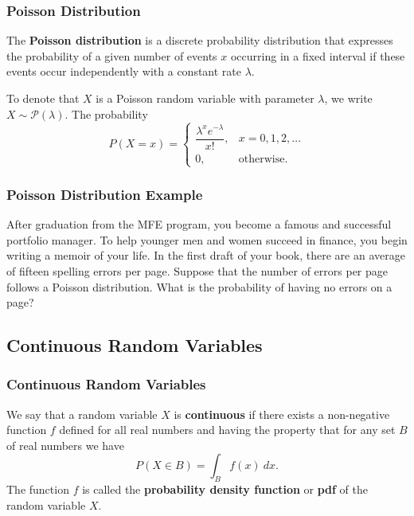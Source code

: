 \documentclass{beamer}
\begin{document}
\begin{frame}
\frametitle{Poisson Distribution}
\begin{Definition} 
The {\bf Poisson distribution} is a discrete probability distribution that expresses the probability of a given number of events $x$ occurring in a fixed interval if these events occur independently with a constant rate $\lambda$.
\end{Definition}
To denote that $X$ is a Poisson random variable with parameter $\lambda$, we write $X\sim{\mathcal{P}(\lambda)}$. The probability 
$$
P(X = x) = \begin{cases} \dfrac{\lambda^x e^{-\lambda}}{x!},&  x = 0, 1, 2,\ldots\\ 0,	&	\text{otherwise.}\end{cases}
$$
\end{frame}

\begin{frame}[t]
\frametitle{Poisson Distribution Example}
\tiny
\begin{Example}
After graduation from the MFE program, you become a famous and successful portfolio manager. To help younger men and women succeed in finance, you begin writing a memoir of your life. In the first draft of your book, there are an average of fifteen spelling errors per page. Suppose that the number of errors per page follows a Poisson distribution. What is the probability of having no errors on a page?
\end{Example}

\end{frame}

\subsection{Continuous Random Variables}

\begin{frame}
\frametitle{Continuous Random Variables}
\begin{Definition}
We say that a random variable $X$ is {\bf continuous} if there exists a non-negative function $f$ defined for all real numbers and having the property that for any set $B$ of real numbers we have
$$
P(X\in B) = \int_B f(x)\ dx.
$$
The function $f$ is called the {\bf probability density function} or {\bf pdf} of the random variable $X$.
\end{Definition}

\end{frame}
\end{document}
